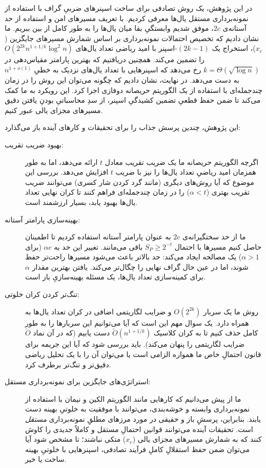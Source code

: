 \documentclass[11pt,a4paper]{report}
\theoremstyle{plain}
\theoremstyle{definition}
\theoremstyle{remark}
\begin{document}
در این پژوهش، یک روش تصادفی برای ساخت اسپنرهای ضربیِ گراف با استفاده از نمونه‌برداری مستقل یال‌ها معرفی کردیم. با تعریف مسیرهای امن و استفاده از حد آستانه‌ی $2c$، موفق شدیم وابستگیِ بقا میان یال‌ها را به طور کامل از بین ببریم. ما نشان دادیم که تخصیص احتمالات نمونه‌برداری بر اساس شمارش مسیرهای جایگزین ($x_e$)، استخراج یک $(2k-1)$-اسپنر با امید ریاضی تعداد یال‌های $O(2^{2k} n^{1+1/k} \log^2 n)$ را تضمین می‌کند. همچنین دریافتیم که بهترین پارامتر مقیاس‌دهی در $k = \Theta(\sqrt{\log n})$ رخ می‌دهد که اسپنرهایی با تعداد یال‌های نزدیک به خطیِ $n^{1+o(1)}$ به دست می‌دهد. در نهایت، نشان دادیم که چگونه می‌توان این روش را در زمان چندجمله‌ای با استفاده از یک الگوریتم حریصانه دوفازی اجرا کرد. این رویکرد به ما کمک می‌کند تا ضمن حفظ قطعیِ تضمین کشیدگیِ اسپنر، از سدِ محاسباتیِ  بودنِ یافتن دقیق مسیرهای مجزای یالی عبور کنیم.

این پژوهش، چندین پرسش جذاب را برای تحقیقات و کارهای آینده باز می‌گذارد:

\begin{description}
    \item[بهبود ضریب تقریب:] 
    اگرچه الگوریتم حریصانه ما یک ضریب تقریب معادل $t$ ارائه می‌دهد، اما به طور همزمان امید ریاضیِ تعداد یال‌ها را نیز با ضریب $t$ افزایش می‌دهد. بررسی این موضوع که آیا روش‌های دیگری (مانند گرد کردن شار کسری) می‌توانند ضریب تقریب بهتری ($\alpha < t$) را در زمان چندجمله‌ای فراهم کنند تا کران نهایی تعداد یال‌ها بهبود یابد، بسیار ارزشمند است.
    
    \item[بهینه‌سازی پارامتر آستانه:] 
    ما از حد سختگیرانه‌ی $2c$ به عنوان پارامتر آستانه استفاده کردیم تا اطمینان حاصل کنیم مسیرها با احتمال $S_P \ge 2^{-t}$ باقی می‌مانند. تغییر این حد به $\alpha c$ (برای $\alpha > 1$) یک مصالحه ایجاد می‌کند: حد بالاتر باعث می‌شود مسیرها راحت‌تر حفظ شوند، اما در عین حال گراف نهایی را چگال‌تر می‌کند. یافتن بهترین مقدار $\alpha$ برای کمینه‌سازی تعداد یال‌ها، یک مسئله بهینه‌سازیِ باز است.
    
    \item[تنگ‌تر کردن کران خلوتی:] 
    روش ما یک سربار $O(2^{2k})$ و ضرایب لگاریتمی اضافی در کران تعداد یال‌ها به همراه دارد. یک سوال مهم این است که آیا می‌توانیم این سربارها را به طور کامل حذف کنیم تا به کران کلاسیک $\tilde{O}(n^{1+1/k})$ دست یابیم (که در آن نماد $\tilde{O}$ ضرایب لگاریتمی را پنهان می‌کند). باید بررسی شود که آیا این جریمه برای قانون احتمالِ خاص ما همواره الزامی است یا می‌توان آن را با یک تحلیل ریاضی دقیق‌تر و تنگ‌تر برطرف کرد.
    
    \item[استراتژی‌های جایگزین برای نمونه‌برداری مستقل:] 
    ما از پیش می‌دانیم که کارهایی مانند الگوریتم الکین و نیمان \cite{elkin2019efficient} با استفاده از نمونه‌برداری وابسته و خوشه‌بندی، می‌توانند با موفقیت به خلوتیِ بهینه دست یابند. بنابراین، پرسشِ باز و حقیقی در مورد مرزهای مطلقِ نمونه‌برداری \emph{مستقل} است. تحقیقات آینده می‌توانند قوانین احتمالِ مستقل و کاملاً جدیدی را کاوش کنند که به شمارش مسیرهای مجزای یالی ($x_e$) متکی نباشند؛ تا مشخص شود آیا می‌توان ضمن حفظ استقلالِ کاملِ فرآیند تصادفی، اسپنرهایی با خلوتیِ بهینه ساخت یا خیر.
\end{description}
\end{document}
